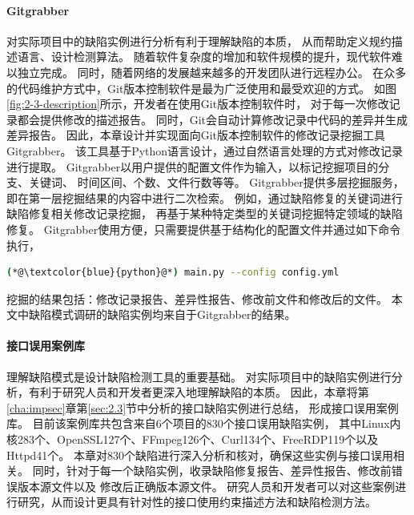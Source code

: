 \paragraph{Gitgrabber}
对实际项目中的缺陷实例进行分析有利于理解缺陷的本质，
从而帮助定义规约描述语言、设计检测算法。
随着软件复杂度的增加和软件规模的提升，现代软件难以独立完成。
同时，随着网络的发展越来越多的开发团队进行远程办公。
在众多的代码维护方式中，Git版本控制软件是最为广泛使用和最受欢迎的方式。
如图\ref{fig:2-3-description}所示，开发者在使用Git版本控制软件时，
对于每一次修改记录都会提供修改的描述报告。
同时，Git会自动计算修改记录中代码的差异并生成差异报告。
因此，本章设计并实现面向Git版本控制软件的修改记录挖掘工具Gitgrabber。
该工具基于Python语言设计，通过自然语言处理的方式对修改记录进行提取。
Gitgrabber以用户提供的配置文件作为输入，以标记挖掘项目的分支、关键词、
时间区间、个数、文件行数等等。
Gitgrabber提供多层挖掘服务，即在第一层挖掘结果的内容中进行二次检索。
例如，通过缺陷修复的关键词进行缺陷修复相关修改记录挖掘，
再基于某种特定类型的关键词挖掘特定领域的缺陷修复。
Gitgrabber使用方便，只需要提供基于结构化的配置文件并通过如下命令执行，
\begin{lstlisting}[language={bash},
basicstyle=\linespread{0.8}\listingsfont,
numbers=none,
xleftmargin=.3\textwidth]
(*@\textcolor{blue}{python}@*) main.py --config config.yml
\end{lstlisting}
挖掘的结果包括：修改记录报告、差异性报告、修改前文件和修改后的文件。
本文中缺陷模式调研的缺陷实例均来自于Gitgrabber的结果。

\paragraph{接口误用案例库}
理解缺陷模式是设计缺陷检测工具的重要基础。
对实际项目中的缺陷实例进行分析，有利于研究人员和开发者更深入地理解缺陷的本质。
因此，本章将第\ref{cha:impsec}章第\ref{sec:2.3}节中分析的接口缺陷实例进行总结，
形成接口误用案例库。
目前该案例库共包含来自6个项目的830个接口误用缺陷实例，
其中Linux内核283个、OpenSSL127个、FFmpeg126个、Curl134个、FreeRDP119个以及Httpd41个。
本章对830个缺陷进行深入分析和核对，确保这些实例与接口误用相关。
同时，针对于每一个缺陷实例，收录缺陷修复报告、差异性报告、修改前错误版本源文件以及
修改后正确版本源文件。
研究人员和开发者可以对这些案例进行研究，从而设计更具有针对性的接口使用约束描述方法和缺陷检测方法。

